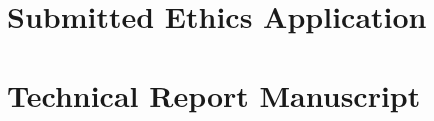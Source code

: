 \documentclass[twoside,12pt,titlepage]{book}
\begin{document}
\frontmatter

%
%
%


\mainmatter







\appendix
\chapter{Submitted Ethics Application}
 
\chapter{Technical Report Manuscript}
\end{document}
